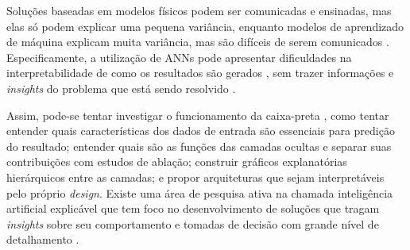  Soluções baseadas em modelos físicos podem ser comunicadas e ensinadas, mas elas só podem explicar uma pequena variância, enquanto modelos de aprendizado de máquina explicam muita variância, mas são difíceis de serem comunicados \cite{Kording2018}. Especificamente, a utilização de ANNs pode apresentar dificuldades na interpretabilidade de como os resultados são gerados \cite{Belthangady2019}, sem trazer informações e \textit{insights} do problema que está sendo resolvido \cite{LewisD2019}. 
 
Assim, pode-se tentar investigar o funcionamento da caixa-preta \cite{Belthangady2019}, como tentar entender quais características dos dados de entrada são essenciais para predição do resultado; entender quais são as funções das camadas ocultas e separar suas contribuições com estudos de ablação; construir gráficos explanatórias hierárquicos entre as camadas; e propor arquiteturas que sejam interpretáveis pelo próprio \textit{design}. Existe uma área de pesquisa ativa na chamada inteligência artificial explicável que tem foco no desenvolvimento de soluções que tragam \textit{insights} sobre seu comportamento e tomadas de decisão com grande nível de detalhamento \cite{2018Gilpin}.



